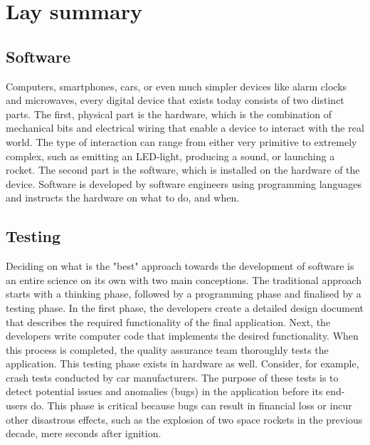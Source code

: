 
\chapter*{Lay summary}

\section*{Software}
Computers, smartphones, cars, or even much simpler devices like alarm clocks and microwaves, every digital device that exists today consists of two distinct parts. The first, physical part is the hardware, which is the combination of mechanical bits and electrical wiring that enable a device to interact with the real world. The type of interaction can range from either very primitive to extremely complex, such as emitting an LED-light, producing a sound, or launching a rocket. The second part is the software, which is installed on the hardware of the device. Software is developed by software engineers using programming languages and instructs the hardware on what to do, and when.

\section*{Testing}
Deciding on what is the "best" approach towards the development of software is an entire science on its own with two main conceptions. The traditional approach starts with a thinking phase, followed by a programming phase and finalised by a testing phase. In the first phase, the developers create a detailed design document that describes the required functionality of the final application. Next, the developers write computer code that implements the desired functionality. When this process is completed, the quality assurance team thoroughly tests the application. This testing phase exists in hardware as well. Consider, for example, crash tests conducted by car manufacturers. The purpose of these tests is to detect potential issues and anomalies (bugs) in the application before its end-users do. This phase is critical because bugs can result in financial loss or incur other disastrous effects, such as the explosion of two space rockets in the previous decade, mere seconds after ignition.

